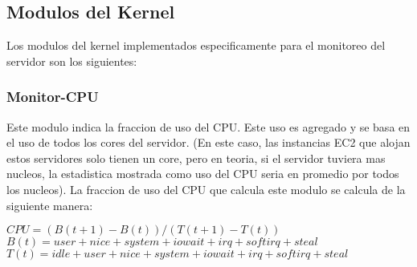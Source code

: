 \documentclass{article}
\begin{document}
\subsection{Modulos del Kernel}
Los modulos del kernel implementados especificamente 
para el monitoreo del servidor son los siguientes:
\subsubsection{Monitor-CPU}
Este modulo indica la fraccion de uso del CPU. Este uso
es agregado y se basa en el uso de todos los cores del servidor. 
(En este caso, las instancias EC2 que alojan estos servidores
solo tienen un core, pero en teoria, si el servidor tuviera 
mas nucleos, la estadistica mostrada como uso del CPU seria 
en promedio por todos los nucleos). 
La fraccion de uso del CPU que calcula este modulo se 
calcula de la siguiente manera:

$ CPU = (B(t+1) - B(t))/(T(t+1) - T(t))$ \\
$ B(t) =  user + nice + system + iowait + irq + softirq + steal $ \\
$ T(t) =  idle + user + nice + system + iowait + irq + softirq + steal $ \\
\end{document}
